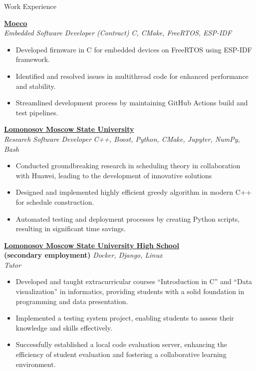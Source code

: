 \documentclass{resume} %
\begin{document}
\begin{rSection}{Work Experience}

{\bf \href{https://www.moeco.io/}{Moeco}} \hfill {} \;  
\\{\textit{ Embedded Software Developer (Contract)}} \hfill {\textit{C, CMake, FreeRTOS, ESP-IDF}}
\begin{itemize}
    \item Developed firmware in C for embedded devices on FreeRTOS using ESP-IDF framework.
    \item Identified and resolved issues in multithread code for enhanced performance and stability.
    \item Streamlined development process by maintaining GitHub Actions build and test pipelines.
\end{itemize}

{\bf \href{https://www.msu.ru/en/index.html}{Lomonosov Moscow State University} } \hfill {} \;  
\\{\textit{ Research Software Developer }} \hfill {\textit{C++, Boost, Python, CMake, Jupyter, NumPy, Bash}}
\begin{itemize}
    \item Conducted groundbreaking research in scheduling theory in collaboration with Huawei, leading to the development of innovative solutions
    \item Designed and implemented highly efficient greedy algorithm in modern C++ for schedule construction.
    \item Automated testing and deployment processes by creating Python scripts, resulting in significant time savings.
\end{itemize}

{\bf \href{https://school.msu.ru/}{Lomonosov Moscow State University High School} } \hfill {} \; 
\\{\bf (secondary employment)} \hfill {\textit{Docker, Django, Linux}}
\\{\textit{ Tutor }}
\begin{itemize}
    \item Developed and taught extracurricular courses ``Introduction in C'' and ``Data visualization'' in informatics, providing students with a solid foundation in programming and data presentation.
    \item Implemented a testing system project, enabling students to assess their knowledge and skills effectively.
    \item Successfully established a local code evaluation server, enhancing the efficiency of student evaluation and fostering a collaborative learning environment.
\end{itemize}


\end{rSection}
\end{document}
